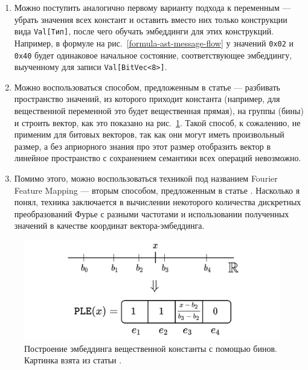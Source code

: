 \begin{enumerate}
    \item Можно поступить аналогично первому варианту подхода к переменным --- убрать значения всех констант и оставить вместо них только конструкции вида \texttt{Val[Тип]}, после чего обучать эмбеддинги для этих конструкций. Например, в формуле на рис.~\ref{formula-ast-message-flow} у значений \texttt{0x02} и \texttt{0x40} будет одинаковое начальное состояние, соответствующее эмбеддингу, выученному для записи \texttt{Val[BitVec<8>]}.
    \item Можно воспользоваться способом, предложенным в статье \cite{embeddings-for-numerical-features-paper} --- разбивать пространство значений, из которого приходит константа (например, для вещественной переменной это будет вещественная прямая), на группы (бины) и строить вектор, как это показано на рис.~\ref{linear-bins-for-values}. Такой способ, к сожалению, не применим для битовых векторов, так как они могут иметь произвольный размер, а без априорного знания про этот размер отобразить вектор в линейное пространство с сохранением семантики всех операций невозможно.
    \item Помимо этого, можно воспользоваться техникой под названием Fourier Feature Mapping \cite{ffm-paper-1} \cite{ffm-paper-2} --- вторым способом, предложенным в статье \cite{embeddings-for-numerical-features-paper}. Насколько я понял, техника заключается в вычислении некоторого количества дискретных преобразований Фурье с разными частотами и использовании полученных значений в качестве координат вектора-эмбеддинга.
\end{enumerate}

\begin{figure}[ht]
\begin{center}
    \includegraphics[scale=0.25]{./assets/linear-bins-for-values.png}
    \caption{\label{linear-bins-for-values} Построение эмбеддинга вещественной константы с помощью бинов. Картинка взята из статьи \cite{embeddings-for-numerical-features-paper}.}
\end{center}
\end{figure}

